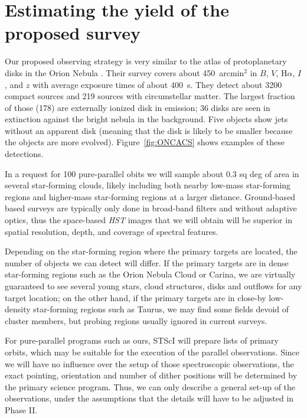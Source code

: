 \documentclass[12pt]{article}
\begin{document}
\section{Estimating the yield of the proposed survey}
Our proposed observing strategy is very similar to the atlas of protoplanetary disks in the Orion Nebula \citep{2008AJ....136.2136R,2013ApJS..207...10R}. Their survey covers about 450~arcmin$^2$ in $B$, $V$, H$\alpha$, $I$, and $z$ with average exposure times of about 400~s. They detect about 3200 compact sources and 219 sources with circumstellar matter. The largest fraction of those (178) are externally ionized disk in emission; 36 disks are seen in extinction against the bright nebula in the background. Five objects show jets without an apparent disk (meaning that the disk is likely to be smaller because the objects are more evolved). Figure~\ref{fig:ONCACS} shows examples of these detections. 

In a request for 100 pure-parallel obits we will sample about 0.3 sq deg of
area in several star-forming clouds, likely including both nearby low-mass
star-forming regions and higher-mass star-forming regions at a larger distance.
 Ground-based based surveys are typically only done in broad-band
filters \citep[IPHAS, which also includes an H$\alpha$ filter is an
  exception][]{2005MNRAS.362..753D} and without adaptive optics, thus the
space-based \emph{HST} images that we will obtain will be superior in spatial
resolution, depth, and coverage of spectral features.


Depending on the star-forming region where the primary targets are located, the
number of objects we can detect will differ. If the primary targets are in
dense star-forming regions such as the Orion Nebula Cloud or Carina, we are
virtually guaranteed to see several young stars, cloud structures, disks and
outflows for any target location; on the other hand, if the primary targets are
in close-by low-density star-forming regions such as Taurus, we may find some
fields devoid of cluster members, but probing regions usually ignored in current surveys. 





%
%
\describeobservations   %
For pure-parallel programs such as ours, STScI will prepare lists of primary orbits, which may be suitable for the execution of the parallel observations. Since we will have no influence over the setup of those spectroscopic observations, the exact pointing, orientation and number of dither positions will be determined by the primary science program. Thus, we can only describe a general set-up of the observations, under the assumptions that the details will have to be adjusted in Phase II.
\end{document}
